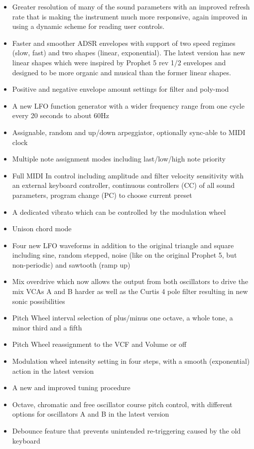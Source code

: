 \documentclass[landscape, 11pt, oneside]{report}
\newenvironment{flowtext}{\addmargin[0cm]{7cm}}{\endaddmargin} %
\begin{document}
\begin{flowtext}
\begin{itemize}
  \setlength\itemsep{0cm}
  \item Greater resolution of many of the sound parameters with an improved refresh rate that is making the instrument much more responsive, again improved in \version using a dynamic scheme for reading user controls.
  \item Faster and smoother ADSR envelopes with support of two speed regimes (slow, fast) and two shapes (linear, exponential). The latest version \version has new linear shapes which were inspired by Prophet 5 rev 1/2 envelopes and designed to be more organic and musical than the former linear shapes.
  \item Positive and negative envelope amount settings for filter and poly-mod 
  \item A new LFO function generator with a wider frequency range from one cycle every 20 seconds to about 60Hz
  \item Assignable, random and up/down arpeggiator, optionally sync-able to MIDI clock
  \item Multiple note assignment modes including last/low/high note priority
  \item Full MIDI In control including amplitude and filter velocity sensitivity with an external keyboard controller, continuous controllers (CC) of all sound parameters, program change (PC) to choose current preset
  \item A dedicated vibrato which can be controlled by the modulation wheel
  \item Unison chord mode
  \item Four new LFO waveforms in addition to the original triangle and square including sine, random stepped, noise (like on the original Prophet 5, but non-periodic) and sawtooth (ramp up)
  \item Mix overdrive which now allows the output from both oscillators to drive the mix VCAs A and B harder as well as the Curtis 4 pole filter resulting in new sonic possibilities
  \item Pitch Wheel interval selection of plus/minus one octave, a whole tone, a minor third and a fifth
  \item Pitch Wheel reassignment to the VCF and Volume or off   
  \item Modulation wheel intensity setting in four steps, with a smooth (exponential) action in the latest version \version
  \item A new and improved tuning procedure
  \item Octave, chromatic and free oscillator course pitch control, with different options for oscillators A and B in the latest version \version
  \item Debounce feature that prevents unintended re-triggering caused by the old keyboard
\end{itemize}


\end{flowtext}
\end{document}
